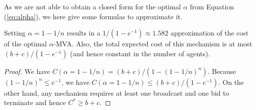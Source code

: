 As we are not able to obtain a closed form for the optimal $\alpha$ from
Equation (\ref{eq:alpha}), we here give some formulas to approximate it.




\begin{theorem}
Setting $\alpha = 1-1/n$ results in a $1/(1-e^{-1}) \approx 1.582$ approximation of the
cost of the optimal $\alpha$-MVA.  Also, the total expected cost of this
mechanism is at most $(b+c) / (1-e^{-1})$ (and hence constant in the
number of agents).
\end{theorem}

\begin{proof}
  We have $C(\alpha = 1-1/n) = (b+c)/(1-(1-1/n)^n)$. Because $(1-1/n)^n
  \leq e^{-1}$, we have $C(\alpha = 1-1/n) \leq (b+c)/(1-e^{-1})$.
On the other hand, any mechanism requires at
least one broadcast and one bid to terminate and hence $C^* \geq
b+c$. %
\end{proof}


